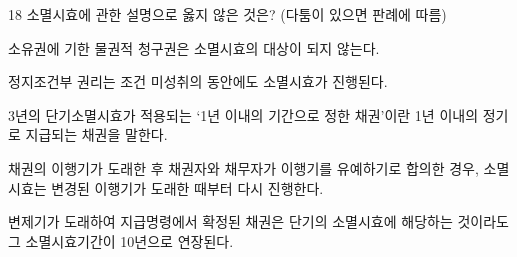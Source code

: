 \begin{question}{18}
소멸시효에 관한 설명으로 옳지 않은 것은? (다툼이 있으면 판례에 따름)
\begin{choices}
  \item 소유권에 기한 물권적 청구권은 소멸시효의 대상이 되지 않는다.
  \item 정지조건부 권리는 조건 미성취의 동안에도 소멸시효가 진행된다.
  \item 3년의 단기소멸시효가 적용되는 ‘1년 이내의 기간으로 정한 채권’이란 1년 이내의 정기로 지급되는 채권을 말한다.
  \item 채권의 이행기가 도래한 후 채권자와 채무자가 이행기를 유예하기로 합의한 경우, 소멸시효는 변경된 이행기가 도래한 때부터 다시 진행한다.
  \item 변제기가 도래하여 지급명령에서 확정된 채권은 단기의 소멸시효에 해당하는 것이라도 그 소멸시효기간이 10년으로 연장된다.
\end{choices}
\end{question}
